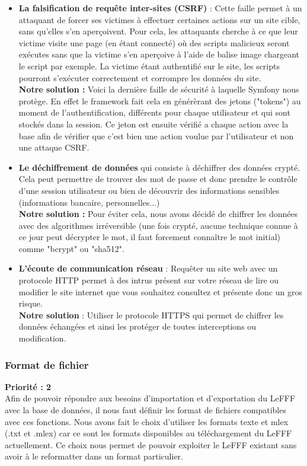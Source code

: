 \documentclass[12pt,a4paper]{article}
\begin{document}
\begin{itemize}
        \item \textbf{La falsification de requête inter-sites (CSRF)} : Cette faille permet à un attaquant de forcer ses victimes à effectuer certaines actions sur un site cible, sans qu'elles s'en aperçoivent. Pour cela, les attaquants cherche à ce que leur victime visite une page (en étant connecté) où des scripts malicieux seront exécutes sans que la victime s'en aperçoive à l'aide de balise image chargeant le script par exemple. La victime étant authentifié sur le site, les scripts pourront s'exécuter correctement et corrompre les données du site. \\
        \textbf{Notre solution :} Voici la dernière faille de sécurité à laquelle Symfony nous protège. En effet le framework fait cela en générèrant des jetons ("tokens") au moment de l'authentification, différents pour chaque utilisateur et qui sont stockés dans la session. Ce jeton est ensuite vérifié a chaque action avec la base afin de vérifier que c'est bien une action voulue par l'utilisateur et non une attaque CSRF.
        \item \textbf{Le déchiffrement de données} qui consiste à déchiffrer des données crypté. Cela peut permettre de trouver des mot de passe et donc prendre le contrôle d'une session utilisateur ou bien de découvrir des informations sensibles (informations bancaire, personnelles...) \\
        \textbf{Notre solution :} Pour éviter cela, nous avons décidé de chiffrer les données avec des algorithmes irréversible (une fois crypté, aucune technique connue à ce jour peut décrypter le mot, il faut forcement connaître le mot initial) comme "bcrypt" ou "sha512".

        \item \textbf{L'écoute de communication réseau} : Requêter un site web avec un protocole HTTP permet à des intrus présent sur votre réseau de lire ou modifier le site internet que vous souhaitez consultez et présente donc un gros risque. \\
        \textbf{Notre solution} : Utiliser le protocole HTTPS qui permet de chiffrer les données échangées et ainsi les protéger de toutes interceptions ou modification.
    \end{itemize}

    \subsubsection{Format de fichier}
    \textbf{Priorité : 2} \\
    Afin de pouvoir répondre aux besoins d'importation et d'exportation du LeFFF avec la base de données, il nous faut définir les format de fichiers compatibles avec ces fonctions.
    Nous avons fait le choix d'utiliser les formats texte et mlex (.txt et .mlex)  car ce sont les formats disponibles au téléchargement du LeFFF actuellement. Ce choix nous permet de pouvoir exploiter le LeFFF existant sans avoir à le reformatter dans un format particulier.
\end{document}
